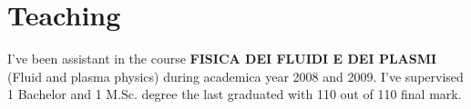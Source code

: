 \section{Teaching}
I've been assistant in the course \textbf{FISICA DEI FLUIDI E DEI PLASMI}
(Fluid and plasma physics) during academica year 2008 and 2009. I've
supervised 1 Bachelor and 1 M.Sc. degree the last graduated with 110
out of 110 final mark. 
